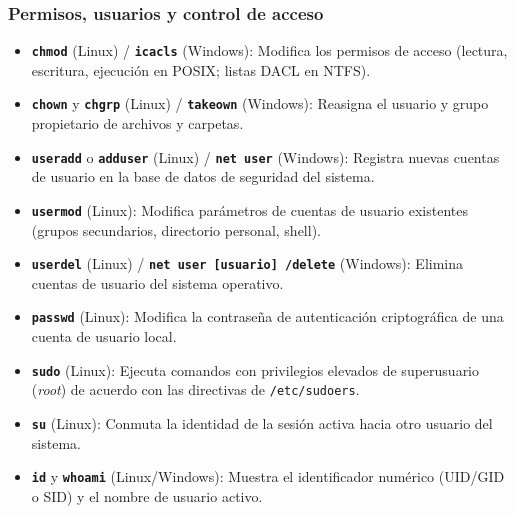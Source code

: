 \documentclass[12pt]{article}
\begin{document}
\subsubsection{Permisos, usuarios y control de acceso}
\begin{itemize}[leftmargin=*, noitemsep, topsep=2pt]
    \item \textbf{\texttt{chmod}} (Linux) / \textbf{\texttt{icacls}} (Windows): Modifica los permisos de acceso (lectura, escritura, ejecución en POSIX; listas DACL en NTFS).
    \item \textbf{\texttt{chown}} y \textbf{\texttt{chgrp}} (Linux) / \textbf{\texttt{takeown}} (Windows): Reasigna el usuario y grupo propietario de archivos y carpetas.
    \item \textbf{\texttt{useradd}} o \textbf{\texttt{adduser}} (Linux) / \textbf{\texttt{net user}} (Windows): Registra nuevas cuentas de usuario en la base de datos de seguridad del sistema.
    \item \textbf{\texttt{usermod}} (Linux): Modifica parámetros de cuentas de usuario existentes (grupos secundarios, directorio personal, shell).
    \item \textbf{\texttt{userdel}} (Linux) / \textbf{\texttt{net user [usuario] /delete}} (Windows): Elimina cuentas de usuario del sistema operativo.
    \item \textbf{\texttt{passwd}} (Linux): Modifica la contraseña de autenticación criptográfica de una cuenta de usuario local.
    \item \textbf{\texttt{sudo}} (Linux): Ejecuta comandos con privilegios elevados de superusuario (\textit{root}) de acuerdo con las directivas de \texttt{/etc/sudoers}.
    \item \textbf{\texttt{su}} (Linux): Conmuta la identidad de la sesión activa hacia otro usuario del sistema.
    \item \textbf{\texttt{id}} y \textbf{\texttt{whoami}} (Linux/Windows): Muestra el identificador numérico (UID/GID o SID) y el nombre de usuario activo.
\end{itemize}
\end{document}
